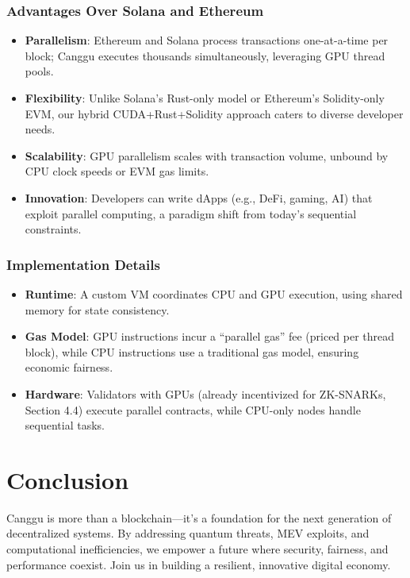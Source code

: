 \documentclass[12pt]{article}
\begin{document}
\subsubsection{Advantages Over Solana and Ethereum}
\begin{justify}
    
\begin{itemize}
    \item \textbf{Parallelism}: Ethereum and Solana process transactions one-at-a-time per block; Canggu executes thousands simultaneously, leveraging GPU thread pools.
    
  \item \textbf{Flexibility}: Unlike Solana’s Rust-only model or Ethereum’s Solidity-only EVM, our hybrid CUDA+Rust+Solidity approach caters to diverse developer needs.

   \item \textbf{Scalability}: GPU parallelism scales with transaction volume, unbound by CPU clock speeds or EVM gas limits.

    \item \textbf{Innovation}: Developers can write dApps (e.g., DeFi, gaming, AI) that exploit parallel computing, a paradigm shift from today’s sequential constraints.
    

\end{itemize}

\subsubsection{Implementation Details}
    \begin{itemize} 
        \item \textbf{Runtime}: A custom VM coordinates CPU and GPU execution, using shared memory for state consistency.
    
        \item \textbf{Gas Model}: GPU instructions incur a “parallel gas” fee (priced per thread block), while CPU instructions use a traditional gas model, ensuring economic fairness.
        
        \item \textbf{Hardware}: Validators with GPUs (already incentivized for ZK-SNARKs, Section 4.4) execute parallel contracts, while CPU-only nodes handle sequential tasks.
    \end{itemize}

\end{justify}

\section{Conclusion}
\begin{justify}
Canggu is more than a blockchain—it’s a foundation for the next generation of decentralized systems. By addressing quantum threats, MEV exploits, and computational inefficiencies, we empower a future where security, fairness, and performance coexist. Join us in building a resilient, innovative digital economy.
\end{justify}
\end{document}
